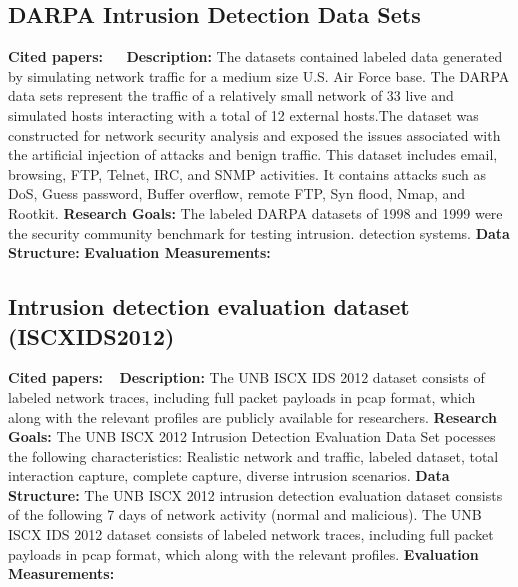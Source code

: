 \subsection{DARPA Intrusion Detection Data Sets}
\textbf{Cited papers:}~\cite{brown2009analysis} ~\cite{mchugh2000testing}\newline
\textbf{Description:} The datasets contained labeled data generated by simulating network traffic for a medium size U.S. Air Force base. The DARPA data sets represent the traffic of a relatively small network of 33 live and simulated hosts interacting with a total of 12 external hosts.The dataset was constructed for network security analysis and exposed the issues associated with the artificial injection of attacks and benign traffic. This dataset includes email, browsing, FTP, Telnet, IRC, and SNMP activities. It contains attacks such as DoS, Guess password, Buffer overflow, remote FTP, Syn flood, Nmap, and Rootkit.\newline
\textbf{Research Goals:} The labeled DARPA datasets of 1998 and 1999 were the security community benchmark for testing intrusion.
detection systems. \newline
\textbf{Data Structure:} \newline
\textbf{Evaluation Measurements:} \newline





\subsection{Intrusion detection evaluation dataset (ISCXIDS2012)}
\textbf{Cited papers:} ~\cite{shiravi2012toward}\newline
\textbf{Description:} The UNB ISCX IDS 2012 dataset consists of labeled network traces, including full packet payloads in pcap format, which along with the relevant profiles are publicly available for researchers.  \newline
\textbf{Research Goals:}  The UNB ISCX 2012 Intrusion Detection Evaluation Data Set pocesses the following characteristics: Realistic network and traffic, labeled dataset, total interaction capture, complete capture, diverse intrusion scenarios.  \newline
\textbf{Data Structure:} The UNB ISCX 2012 intrusion detection evaluation dataset consists of the following 7 days of network activity (normal and malicious). The UNB ISCX IDS 2012 dataset consists of labeled network traces, including full packet payloads in pcap format, which along with the relevant profiles. \newline
\textbf{Evaluation Measurements:} \newline




